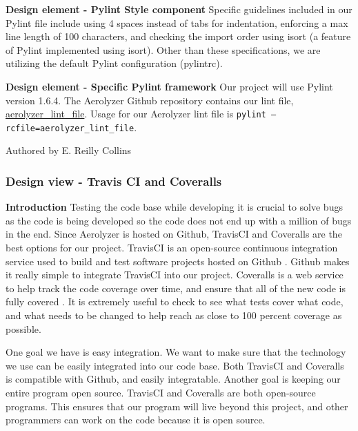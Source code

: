 \documentclass[onecolumn, draftclsnofoot,10pt, compsoc]{IEEEtran}
\begin{document}
\begin{flushleft}
\medskip

\textbf{Design element - Pylint Style component} Specific guidelines included in our Pylint file include using 4 spaces instead of tabs for indentation, enforcing a max line length of 100 characters, and checking the import order using isort (a feature of Pylint implemented using isort). Other than these specifications, we are utilizing the default Pylint configuration (pylintrc).

\medskip

\textbf{Design element - Specific Pylint framework} Our project will use Pylint version 1.6.4. The Aerolyzer Github repository contains our lint file, {\href{https://github.com/Aerolyzer/Aerolyzer/blob/master/aerolyzer_lint_file}{aerolyzer\_lint\_file}}. Usage for our Aerolyzer lint file is \texttt{pylint --rcfile=aerolyzer\_lint\_file}.

\smallskip

\footnotesize Authored by E. Reilly Collins
\normalsize

\bigskip

\subsubsection{Design view - Travis CI and Coveralls}
\textbf{Introduction} Testing the code base while developing it is crucial to solve bugs as the code is being developed so the code does not end up with a million of bugs in the end.  Since Aerolyzer is hosted on Github, TravisCI and Coveralls are the best options for our project. TravisCI is an open-source continuous integration service used to build and test software projects hosted on Github \cite{15}.  Github makes it really simple to integrate TravisCI into our project. Coveralls is a  web service to help track the code coverage over time, and ensure that all of the new code is fully covered \cite{16}. It is extremely useful to check to see what tests cover what code, and what needs to be changed to help reach as close to 100 percent coverage as possible.

\medskip

One goal we have is easy integration. We want to make sure that the technology we use can be easily integrated into our code base. Both TravisCI and Coveralls is compatible with Github, and easily integratable. Another goal is keeping our entire program open source. TravisCI and Coveralls are both open-source programs. This ensures that our program will live beyond this project, and other programmers can work on the code because it is open source.


\end{flushleft}
\end{document}
